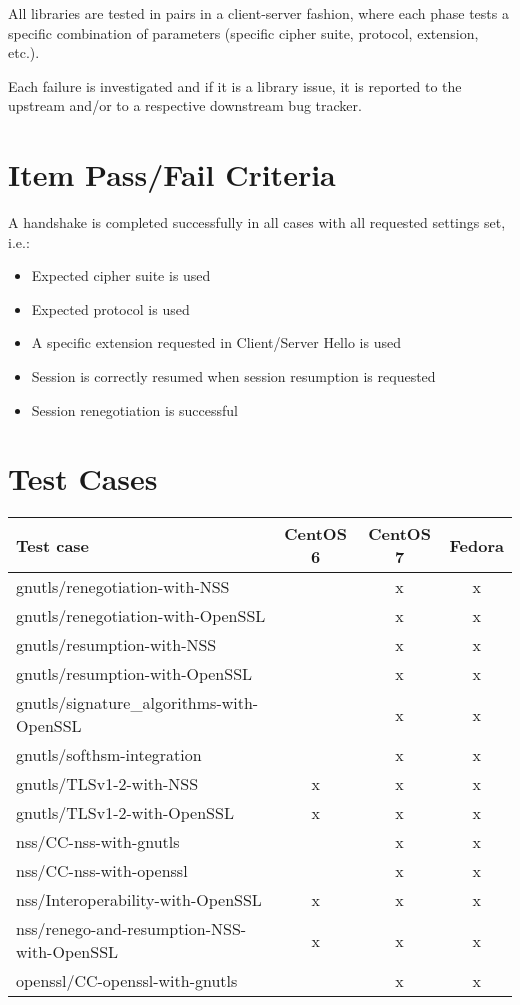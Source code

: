     All libraries are tested in pairs in a client-server fashion, where each
    phase tests a specific combination of parameters (specific cipher suite,
    protocol, extension, etc.).

    Each failure is investigated and if it is a library issue, it is reported
    to the upstream and/or to a respective downstream bug tracker.

\section{Item Pass/Fail Criteria}
    A handshake is completed successfully in all cases with all requested
    settings set, i.e.:
    \begin{itemize}
        \item Expected cipher suite is used
        \item Expected protocol is used
        \item A specific extension requested in Client/Server Hello is used
        \item Session is correctly resumed when session resumption is requested
        \item Session renegotiation is successful
    \end{itemize}

\section{Test Cases}
    \noindent\begin{tabularx}{\linewidth}{@{}X c c c }
    \caption{Test case matrix}\label{tab:test-plan-matrix} \\
    \toprule
    \textbf{Test case} & \textbf{CentOS 6} & \textbf{CentOS 7} & \textbf{Fedora} \\
    \midrule
    \endhead
    gnutls/renegotiation-with-NSS                 &   & x & x \\
    gnutls/renegotiation-with-OpenSSL             &   & x & x \\
    gnutls/resumption-with-NSS                    &   & x & x \\
    gnutls/resumption-with-OpenSSL                &   & x & x \\
    gnutls/signature\_algorithms-with-OpenSSL     &   & x & x \\
    gnutls/softhsm-integration                    &   & x & x \\
    gnutls/TLSv1-2-with-NSS                       & x & x & x \\
    gnutls/TLSv1-2-with-OpenSSL                   & x & x & x \\
    \hline
    nss/CC-nss-with-gnutls                        &   & x & x \\
    nss/CC-nss-with-openssl                       &   & x & x \\
    nss/Interoperability-with-OpenSSL             & x & x & x \\
    nss/renego-and-resumption-NSS-with-OpenSSL    & x & x & x \\
    \hline
    openssl/CC-openssl-with-gnutls                &   & x & x \\
    \end{tabularx}

